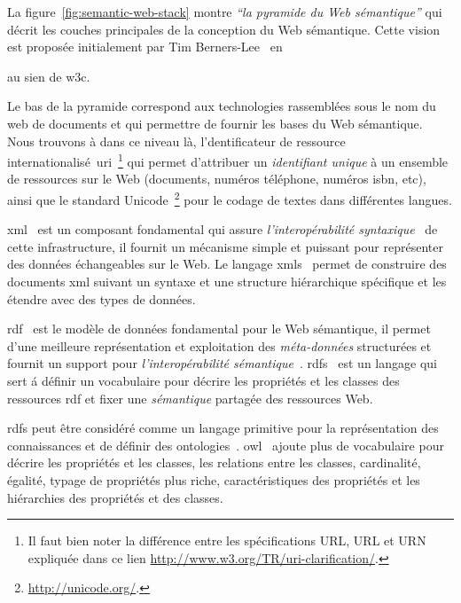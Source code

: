 La figure~\ref{fig:semantic-web-stack} montre \emph{``la pyramide du
  Web sémantique''} qui décrit les couches principales de la
conception du Web sémantique. Cette vision est proposée initialement
par Tim Berners-Lee~\cite{berners2000xml} en \date{2000} au sien de
\acrshort{w3c}.\medskip

Le bas de la pyramide correspond aux technologies rassemblées sous le
nom du web de documents et qui permettre de fournir les bases du Web
sémantique. Nous trouvons à dans ce niveau là, l'dentificateur de
ressource internationalisé~\acrshort{uri}~\footnote{Il faut bien noter
  la différence entre les spécifications URL, URL et URN expliquée
  dans ce lien \url{http://www.w3.org/TR/uri-clarification/}.} qui
permet d'attribuer un \emph{identifiant unique} à un ensemble de
ressources sur le Web (documents, numéros téléphone, numéros
\acrshort{isbn}, etc), ainsi que le standard
\textsf{Unicode}~\footnote{\url{http://unicode.org/}.}  pour le codage
de textes dans différentes langues.\medskip

\acrshort{xml}~\cite{bray1998extensible} est un composant fondamental
qui assure \emph{l'interopérabilité
  syntaxique}~\cite{decker2000semantic} de cette infrastructure, il
fournit un mécanisme simple et puissant pour représenter des données
échangeables sur le Web. Le langage
\acrshort{xmls}~\cite{fallside2004xml} permet de construire des
documents \acrshort{xml} suivant un syntaxe et une structure
hiérarchique spécifique et les étendre avec des types de
données.\medskip

\acrshort{rdf}~\cite{lassila1999resource} est le modèle de données
fondamental pour le Web sémantique, il permet d'une meilleure
représentation et exploitation des \emph{méta-données} structurées et
fournit un support pour \emph{l'interopérabilité
  sémantique}~\cite{decker2000semantic}. \acrshort{rdfs}~\cite{brickley2000resource}
est un langage qui sert á définir un vocabulaire pour décrire les
propriétés et les classes des ressources \acrshort{rdf} et fixer une
\emph{sémantique} partagée des ressources Web.\medskip

\acrshort{rdfs} peut être considéré comme un langage primitive pour la
représentation des connaissances et de définir des
ontologies~\cite{antoniou2012semantic}. \acrshort{owl}~\cite{martin2004owl}
ajoute plus de vocabulaire pour décrire les propriétés et les classes,
les relations entre les classes, cardinalité, égalité, typage de
propriétés plus riche, caractéristiques des propriétés et les
hiérarchies des propriétés et des classes.\medskip

